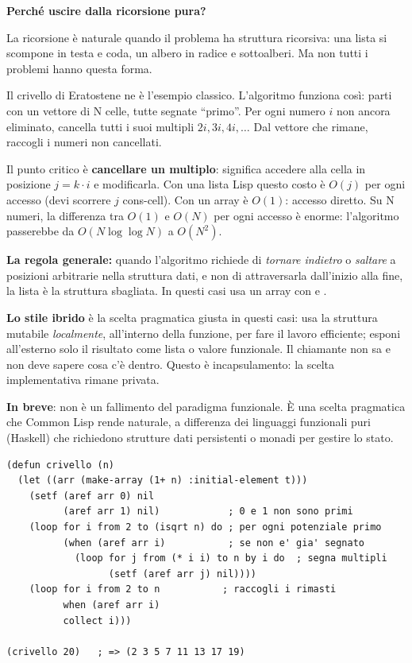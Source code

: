 \begin{tcolorbox}[
  enhanced,
  colback=black!2, colframe=black!20,
  arc=3pt, boxrule=0.4pt,
  left=12pt, right=12pt, top=9pt, bottom=9pt,
  before skip=8pt, after skip=10pt
]
\small\color{black!65}

\textbf{Perché uscire dalla ricorsione pura?}

\medskip
La ricorsione è naturale quando il problema ha struttura ricorsiva:
una lista si scompone in testa e coda, un albero in radice e sottoalberi.
Ma non tutti i problemi hanno questa forma.

\medskip
Il crivello di Eratostene ne è l'esempio classico.
L'algoritmo funziona così: parti con un vettore di N celle, tutte
segnate ``primo''. Per ogni numero $i$ non ancora eliminato, cancella
tutti i suoi multipli $2i, 3i, 4i, \ldots$ Dal vettore che rimane,
raccogli i numeri non cancellati.

\medskip
Il punto critico è \textbf{cancellare un multiplo}: significa accedere
alla cella in posizione $j = k \cdot i$ e modificarla.
Con una lista Lisp questo costo è $O(j)$ per ogni accesso
(devi scorrere $j$ cons-cell). Con un array è $O(1)$: accesso diretto.
Su N numeri, la differenza tra $O(1)$ e $O(N)$ per ogni accesso
è enorme: l'algoritmo passerebbe da $O(N \log \log N)$ a $O(N^2)$.

\medskip
\textbf{La regola generale:}
quando l'algoritmo richiede di \emph{tornare indietro} o
\emph{saltare} a posizioni arbitrarie nella struttura dati, e non
di attraversarla dall'inizio alla fine, la lista è la struttura sbagliata.
In questi casi usa un array con  e .

\medskip
\textbf{Lo stile ibrido} è la scelta pragmatica giusta in questi casi:
usa la struttura mutabile \emph{localmente}, all'interno della funzione,
per fare il lavoro efficiente; esponi all'esterno solo il risultato
come lista o valore funzionale.
Il chiamante non sa e non deve sapere cosa c'è dentro.
Questo è incapsulamento: la scelta implementativa rimane privata.

\medskip
\textbf{In breve}: non è un fallimento del paradigma funzionale.
È una scelta pragmatica che Common Lisp rende naturale,
a differenza dei linguaggi funzionali puri (Haskell) che richiedono
strutture dati persistenti o monadi per gestire lo stato.
\end{tcolorbox}

\begin{esempio}
\begin{lstlisting}
(defun crivello (n)
  (let ((arr (make-array (1+ n) :initial-element t)))
    (setf (aref arr 0) nil
          (aref arr 1) nil)            ; 0 e 1 non sono primi
    (loop for i from 2 to (isqrt n) do ; per ogni potenziale primo
          (when (aref arr i)           ; se non e' gia' segnato
            (loop for j from (* i i) to n by i do  ; segna multipli
                  (setf (aref arr j) nil))))
    (loop for i from 2 to n           ; raccogli i rimasti
          when (aref arr i)
          collect i)))

(crivello 20)   ; => (2 3 5 7 11 13 17 19)
\end{lstlisting}
\end{esempio}

